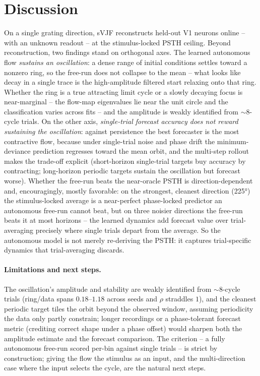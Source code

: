 \documentclass{article}
\newcommand{\svjf}{sVJF}
\begin{document}
\section{Discussion}
On a single grating direction, \svjf{} reconstructs held-out V1 neurons online -- with an
unknown readout -- at the stimulus-locked PSTH ceiling. Beyond reconstruction, two findings
stand on orthogonal axes. The learned autonomous flow \emph{sustains an oscillation}: a dense
range of initial conditions settles toward a nonzero ring, so the free-run does not collapse to
the mean -- what looks like decay in a single trace is the high-amplitude filtered start relaxing
onto that ring. Whether the ring is a true attracting limit cycle or a slowly decaying focus is
near-marginal -- the flow-map eigenvalues lie near the unit circle and the classification varies
across fits -- and the amplitude is weakly identified from $\sim$8-cycle trials. On the other axis,
\emph{single-trial forecast accuracy does not reward sustaining the oscillation}: against
persistence the best forecaster is the most contractive flow, because under single-trial noise and
phase drift the minimum-deviance prediction regresses toward the mean orbit, and the multi-step
rollout makes the trade-off explicit (short-horizon single-trial targets buy accuracy by
contracting; long-horizon periodic targets sustain the oscillation but forecast worse). Whether the
free-run beats the near-oracle PSTH is direction-dependent and, encouragingly, mostly favorable: on
the strongest, cleanest direction (\ang{225}) the stimulus-locked average is a near-perfect
phase-locked predictor an autonomous free-run cannot beat, but on three noisier directions the
free-run beats it at most horizons -- the learned dynamics add forecast value over trial-averaging
precisely where single trials depart from the average. So the autonomous model is not merely
re-deriving the PSTH: it captures trial-specific dynamics that trial-averaging discards.

\paragraph{Limitations and next steps.} The oscillation's amplitude and stability are weakly
identified from $\sim$8-cycle trials (ring/data spans $0.18$--$1.18$ across seeds and $\rho$
straddles $1$), and the cleanest periodic
target tiles the orbit beyond the observed window, assuming periodicity the data only partly
constrain; longer recordings or a phase-tolerant forecast metric (crediting correct shape under a
phase offset) would sharpen both the amplitude estimate and the forecast comparison. The
criterion -- a fully autonomous free-run scored per-bin against single trials -- is strict by
construction; giving the flow the stimulus as an input, and the multi-direction case where the
input selects the cycle, are the natural next steps.

\printbibliography
\end{document}
